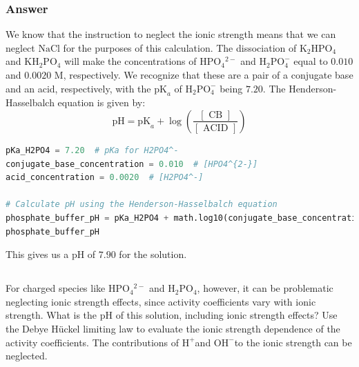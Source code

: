 \documentclass[12pt]{article}
\begin{document}
\subsubsection{Answer}
We know that the instruction to neglect the ionic strength means that we can neglect $\mathrm{NaCl}$ for the purposes of this calculation. The dissociation of $\mathrm{K}_{2} \mathrm{HPO}_{4}$ and $\mathrm{KH}_{2} \mathrm{PO}_{4}$ will make the concentrations of $\mathrm{HPO}_{4}{ }^{2-}$ and $\mathrm{H}_{2} \mathrm{PO}_{4}^{-}$ equal to $0.010$ and $0.0020$ M, respectively. We recognize that these are a pair of a conjugate base and an acid, respectively, with the $\mathrm{pK}_{a}$ of $\mathrm{H}_{2} \mathrm{PO}_{4}^{-}$ being $7.20$.
The Henderson-Hasselbalch equation is given by:
\begin{equation}
  \mathrm{pH}=\mathrm{pK}_{a}+\log \left(\frac{[\text { CB }]}{[\text { ACID }]}\right)
\end{equation}
\begin{lstlisting}[language=Python]
pKa_H2PO4 = 7.20  # pKa for H2PO4^-
conjugate_base_concentration = 0.010  # [HPO4^{2-}]
acid_concentration = 0.0020  # [H2PO4^-]

# Calculate pH using the Henderson-Hasselbalch equation
phosphate_buffer_pH = pKa_H2PO4 + math.log10(conjugate_base_concentration / acid_concentration)
phosphate_buffer_pH
\end{lstlisting}
This gives us a $\mathrm{pH}$ of $7.90$ for the solution.
\subsection{}

For charged species like $\mathrm{HPO}_{4}{ }^{2-}$ and $\mathrm{H}_{2} \mathrm{PO}_{4}$, however, it can be problematic neglecting ionic strength effects, since activity coefficients vary with ionic strength. What is the $\mathrm{pH}$ of this solution, including ionic strength effects? Use the Debye Hückel limiting law to evaluate the ionic strength dependence of the activity coefficients. The contributions of $\mathrm{H}^{+}$and $\mathrm{OH}^{-}$to the ionic strength can be neglected.
\end{document}

